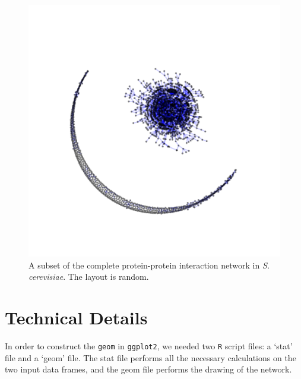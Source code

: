 \documentclass[11pt]{article}\usepackage[]{graphicx}\usepackage[]{color}
\begin{document}
\begin{figure}
\centering
\includegraphics[width=\textwidth]{figure/yeast_ex-1.pdf}
\caption{\label{fig.cap:yeast_ex} A subset of the complete protein-protein interaction network in \emph{S. cerevisiae}. The layout is random.}
\end{figure}
\afterpage{\clearpage}


\section{Technical Details}

In order to construct the \texttt{geom} in \texttt{ggplot2}, we needed two \texttt{R} script files: a `stat' file and a `geom' file. The stat file performs all the necessary calculations on the two input data frames, and the geom file performs the drawing of the network.
\end{document}
